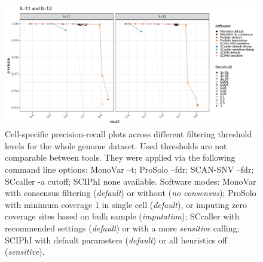 \documentclass[authoryear,preprint,11pt]{scrartcl}
\begin{document}
\begin{figure}[!tpb]
  \includegraphics[width=\linewidth]{figs/Dong2017/Dong2017_prosolo-monovar-scansnv-sccaller_per-cell_prec-rec.pdf}
 \caption{
 Cell-specific precision-recall plots across different filtering threshold levels for the whole genome dataset.\newline \footnotesize
  Used thresholds are not comparable between tools.
  They were applied via the following command line options:
  MonoVar {\ttfamily --t};
  ProSolo {\ttfamily --fdr};
  SCAN-SNV {\ttfamily --fdr};
  SCcaller {\ttfamily -a cutoff};
  SCIPhI {\ttfamily none available}.
  Software modes:
  MonoVar with consensus filtering ({\itshape default}) or without ({\itshape no consensus});
  ProSolo with minimum coverage 1 in single cell ({\itshape default}), or imputing zero coverage sites based on bulk sample ({\itshape imputation});
  SCcaller with recommended settings ({\itshape default}) or with a more {\itshape sensitive} calling;
  SCIPhI with default parameters ({\itshape default}) or all heuristics off ({\itshape sensitive}).
 }
 \label{fig:per-cell_prec-rec_Dong2017}
\end{figure}
\end{document}
